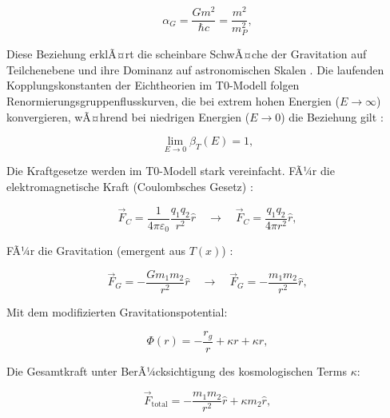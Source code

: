 ﻿\documentclass[twocolumn,aps,prl]{revtex4-2}
\begin{document}
{{{{{{{{{{{													\begin{equation}
														\alpha_G = \frac{G m^2}{\hbar c} = \frac{m^2}{m_P^2}, \label{eq:alpha_G}
													\end{equation}
													
													Diese Beziehung erklÃ¤rt die scheinbare SchwÃ¤che der Gravitation auf Teilchenebene und ihre Dominanz auf astronomischen Skalen \cite{pascher_emergente_2025}. Die laufenden Kopplungskonstanten der Eichtheorien im T0-Modell folgen Renormierungsgruppenflusskurven, die bei extrem hohen Energien (\(E \to \infty\)) konvergieren, wÃ¤hrend bei niedrigen Energien (\(E \to 0\)) die Beziehung gilt \cite{Weinberg1989}:
													
													\begin{equation}
														\lim_{E \to 0} \beta_T(E) = 1, \label{eq:beta_IR_limit}
													\end{equation}
													
													Die Kraftgesetze werden im T0-Modell stark vereinfacht. FÃ¼r die elektromagnetische Kraft (Coulombsches Gesetz) \cite{Feynman1985}:
													
													\begin{equation}
														\vec{F}_C = \frac{1}{4\pi \varepsilon_0} \frac{q_1 q_2}{r^2} \hat{r} \quad \to \quad \vec{F}_C = \frac{q_1 q_2}{4\pi r^2} \hat{r}, \label{eq:coulomb_t0}
													\end{equation}
													
													FÃ¼r die Gravitation (emergent aus \(T(x)\)) \cite{pascher_emergente_2025}:
													
													\begin{equation}
														\vec{F}_G = -\frac{G m_1 m_2}{r^2} \hat{r} \quad \to \quad \vec{F}_G = -\frac{m_1 m_2}{r^2} \hat{r}, \label{eq:gravity_t0}
													\end{equation}
													
													Mit dem modifizierten Gravitationspotential:
													
													\begin{equation}
														\Phi(r) = -\frac{r_g}{r} + \kappa r + \kappa r, \label{eq:detailed_mod_potential}
													\end{equation}
													
													Die Gesamtkraft unter BerÃ¼cksichtigung des kosmologischen Terms \(\kappa\):
													
													\begin{equation}
														\vec{F}_{\text{total}} = -\frac{m_1 m_2}{r^2} \hat{r} + \kappa m_2 \hat{r}, \label{eq:total_force}
													\end{equation}
													
}}}}}}}}}}}
\end{document}

